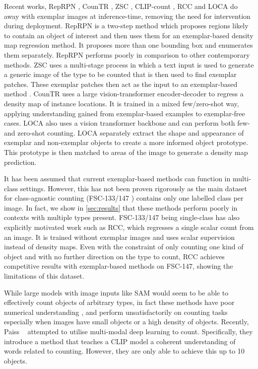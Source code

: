 \documentclass[runningheads]{llncs}
\begin{document}
Recent works, RepRPN \cite{ranjan2022exemplar}, CounTR \cite{liu2022countr}, ZSC \cite{xu2023zero}, CLIP-count \cite{jiang2023clip}, RCC \cite{hobley2023LTCA} and LOCA \cite{Djukic2023LOCA} do away with exemplar images at inference-time,
removing the need for intervention during deployment.
RepRPN is a two-step method which proposes regions likely to contain an object of interest and then uses them for an exemplar-based density map regression method. 
It proposes more than one bounding box and enumerates them separately. RepRPN performs poorly in comparison to other contemporary methods.
ZSC \cite{xu2023zero} uses a multi-stage process in which a text input is used to generate a generic image of the type to be counted that is then used to find exemplar patches. These exemplar patches then act as the input to an exemplar-based method \cite{shi2022represent}.
CounTR \cite{liu2022countr} uses a large vision-transformer encoder-decoder to regress a density map of instance locations. It is trained in a mixed few/zero-shot way, applying understanding gained from exemplar-based examples to exemplar-free cases. 
LOCA \cite{Djukic2023LOCA} also uses a vision transformer backbone and can perform both few- and zero-shot counting.
LOCA separately extract the shape and appearance of exemplar and non-exemplar objects to create a more informed object prototype. This prototype is then matched to areas of the image to generate a density map prediction.

It has been assumed that current exemplar-based methods can function in multi-class settings. However, this has not been proven rigorously as the main dataset for class-agnostic counting (FSC-133/147 \cite{ranjan2021Famnet, hobley2023LTCA}) contains only one labelled class per image. 
In fact, we show in \cref{sec:results} that these methods perform poorly in contexts with multiple types present.
FSC-133/147 being single-class has also explicitly motivated work such as RCC, which regresses a single scalar count from an image. It is trained without exemplar images and uses scalar supervision instead of density maps. 
Even with the constraint of only counting one kind of object and with no further direction on the type to count, RCC achieves competitive results with exemplar-based methods on FSC-147, showing the limitations of this dataset.

While large models with image inputs \cite{openai2023gpt4} like SAM \cite{kirillov2023segany} would seem to be able to effectively count objects of arbitrary types, in fact these methods have poor numerical understanding \cite{ma2023can}, and perform unsatisfactorily on counting tasks especially when images have small objects or a high density of objects.
Recently, Paiss \etal~\cite{paiss2023countclip} attempted to utilise multi-modal deep learning to count. Specifically, they introduce a method that teaches a CLIP model a coherent understanding of words related to counting. However, they are only able to achieve this up to 10 objects.
\end{document}
